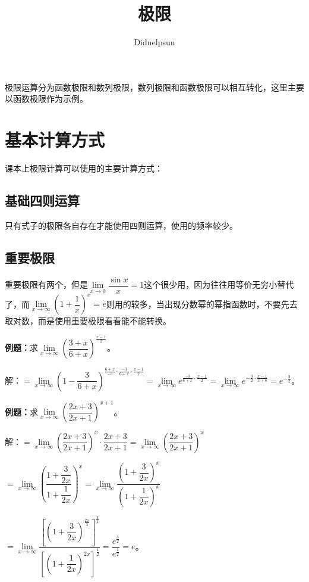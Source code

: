 \documentclass[UTF8, 12pt]{ctexart}
\author{Didnelpsun}
\title{极限}
\date{}
\begin{document}
\maketitle
\thispagestyle{empty}
\tableofcontents
\thispagestyle{empty}
\newpage
\pagestyle{plain}
\setcounter{page}{1}

极限运算分为函数极限和数列极限，数列极限和函数极限可以相互转化，这里主要以函数极限作为示例。

\section{基本计算方式}

课本上极限计算可以使用的主要计算方式：

\subsection{基础四则运算}

只有式子的极限各自存在才能使用四则运算，使用的频率较少。

\subsection{重要极限}

重要极限有两个，但是$\lim\limits_{x\to 0}\dfrac{\sin x}{x}=1$这个很少用，因为往往用等价无穷小替代了，而$\lim\limits_{x\to\infty}\left(1+\dfrac{1}{x}\right)^x=e$则用的较多，当出现分数幂的幂指函数时，不要先去取对数，而是使用重要极限看看能不能转换。\medskip

\textbf{例题：}求$\lim\limits_{x\to\infty}\left(\dfrac{3+x}{6+x}\right)^{\frac{x-1}{2}}$。\medskip

解：$=\lim\limits_{x\to\infty}\left(1-\dfrac{3}{6+x}\right)^{\frac{6+x}{-3}\cdot\frac{-3}{6+x}\cdot\frac{x-1}{2}}=\lim\limits_{x\to\infty}e^{\frac{-3}{6+x}\cdot\frac{x-1}{2}}=\lim\limits_{x\to\infty}e^{-\frac{3}{2}\cdot\frac{x-1}{x+6}}=e^{-\frac{3}{2}}$。\medskip

\textbf{例题：}求$\lim\limits_{x\to\infty}\left(\dfrac{2x+3}{2x+1}\right)^{x+1}$。\medskip

解：$=\lim\limits_{x\to\infty}\left(\dfrac{2x+3}{2x+1}\right)^x\cdot\dfrac{2x+3}{2x+1}=\lim\limits_{x\to\infty}\left(\dfrac{2x+3}{2x+1}\right)^x$\medskip

$=\lim\limits_{x\to\infty}\left(\dfrac{1+\dfrac{3}{2x}}{1+\dfrac{1}{2x}}\right)^x=\lim\limits_{x\to\infty}\dfrac{\left(1+\dfrac{3}{2x}\right)^x}{\left(1+\dfrac{1}{2x}\right)^x}$

$=\lim\limits_{x\to\infty}\dfrac{\left[\left(1+\dfrac{3}{2x}\right)^{\frac{2x}{3}}\right]^{\frac{3}{2}}}{\left[\left(1+\dfrac{1}{2x}\right)^{2x}\right]^{\frac{1}{2}}}=\dfrac{e^{\frac{3}{2}}}{e^{\frac{1}{2}}}=e$。
\end{document}
